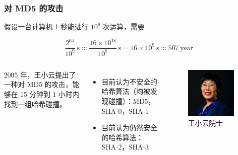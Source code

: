 \documentclass{beamer}
\begin{document}
\begin{frame}
    \frametitle{对 MD5 的攻击}

    假设一台计算机 1 秒能进行 $10^9$ 次运算，需要

    \[\frac{2^{64}}{10^9} \ \text{s} \approx \frac{16\times 10^{18}}{10^9} \ \text{s} = 16 \times 10^9 \ \text{s} \approx 507 \ \text{year}\]

    \begin{columns}

        2005 年，王小云提出了一种对 MD5 的攻击，能够在 15 分钟到 1 小时内找到一组哈希碰撞。

        \vline

        \begin{itemize}
            \item 目前认为不安全的哈希算法（均被发现碰撞）：MD5，SHA-0，SHA-1
            \item 目前认为仍然安全的哈希算法：SHA-2，SHA-3
        \end{itemize}


        \begin{figure}
            \centering
            \includegraphics[width=\textwidth]{res/xiaoyunwang.jpg}
            \caption{王小云院士}
        \end{figure}
    \end{columns}

\end{frame}
\end{document}
